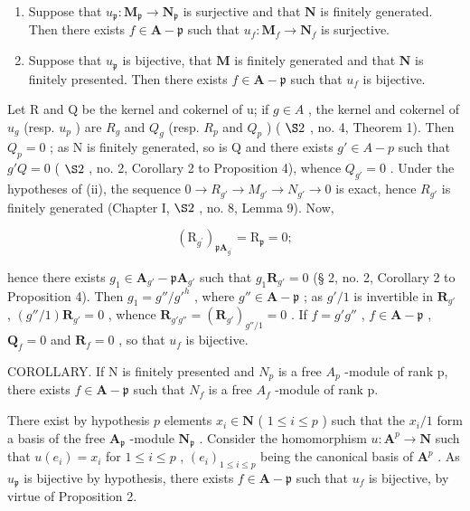 \begin{enumerate}
\def\labelenumi{(\roman{enumi})}
\item
  Suppose that \(u_{\mathfrak{p}} \colon \mathbf{M}_{\mathfrak{p}} \to \mathbf{N}_{\mathfrak{p}}\) is surjective and that \(\mathbf{N}\) is finitely generated. Then there exists \(f \in \mathbf{A} - \mathfrak{p}\) such that \(u_{f} \colon \mathbf{M}_{f} \to \mathbf{N}_{f}\) is surjective.
\item
  Suppose that \(u_{\mathfrak{p}}\) is bijective, that \(\mathbf{M}\) is finitely generated and that \(\mathbf{N}\) is finitely presented. Then there exists \(f \in \mathbf{A} - \mathfrak{p}\) such that \(u_{f}\) is bijective.
\end{enumerate}

Let R and Q be the kernel and cokernel of u; if \(g \in A\) , the kernel and cokernel of \(u_g\) (resp. \(u_p\) ) are \(R_g\) and \(Q_g\) (resp. \(R_p\) and \(Q_p\) ) ( \(\S 2\) , no. 4, Theorem 1). Then \(Q_p = 0\) ; as N is finitely generated, so is Q and there exists \(g' \in A - p\) such that \(g'Q = 0\) ( \(\S 2\) , no. 2, Corollary 2 to Proposition 4), whence \(Q_{g'} = 0\) . Under the hypotheses of (ii), the sequence \(0 \to R_{g'} \to M_{g'} \to N_{g'} \to 0\) is exact, hence \(R_{g'}\) is finitely generated (Chapter I, \(\S 2\) , no. 8, Lemma 9). Now,

\[
\left(\mathrm{R} _ {g ^ {\prime}}\right) _ {\mathfrak{p}\mathbf{A}_{g ^ {\prime}}} = \mathrm{R} _ {\mathfrak{p}} = 0;
\]

hence there exists \(g_1 \in \mathbf{A}_{g'} - \mathfrak{p}\mathbf{A}_{g'}\) such that \(g_1\mathbf{R}_{g'} = 0\) (§ 2, no. 2, Corollary 2 to Proposition 4). Then \(g_1 = g'' / g'^h\) , where \(g'' \in \mathbf{A} - \mathfrak{p}\) ; as \(g' / 1\) is invertible in \(\mathbf{R}_{g'}\) , \((g'' / 1)\mathbf{R}_{g'} = 0\) , whence \(\mathbf{R}_{g'g''} = (\mathbf{R}_{g'})_{g'' / 1} = 0\) . If \(f = g'g''\) , \(f \in \mathbf{A} - \mathfrak{p}\) , \(\mathbf{Q}_f = 0\) and \(\mathbf{R}_f = 0\) , so that \(u_f\) is bijective.

COROLLARY. If N is finitely presented and \(N_{p}\) is a free \(A_{p}\) -module of rank p, there exists \(f \in \mathbf{A} - \mathfrak{p}\) such that \(N_{f}\) is a free \(A_{f}\) -module of rank p.

There exist by hypothesis \(p\) elements \(x_{i} \in \mathbf{N}\) ( \(1 \leqslant i \leqslant p\) ) such that the \(x_{i}/1\) form a basis of the free \(\mathbf{A}_{\mathfrak{p}}\) -module \(\mathbf{N}_{\mathfrak{p}}\) . Consider the homomorphism \(u: \mathbf{A}^p \to \mathbf{N}\) such that \(u(e_{i}) = x_{i}\) for \(1 \leqslant i \leqslant p\) , \((e_{i})_{1 \leqslant i \leqslant p}\) being the canonical basis of \(\mathbf{A}^p\) . As \(u_{\mathfrak{p}}\) is bijective by hypothesis, there exists \(f \in \mathbf{A} - \mathfrak{p}\) such that \(u_{f}\) is bijective, by virtue of Proposition 2.

